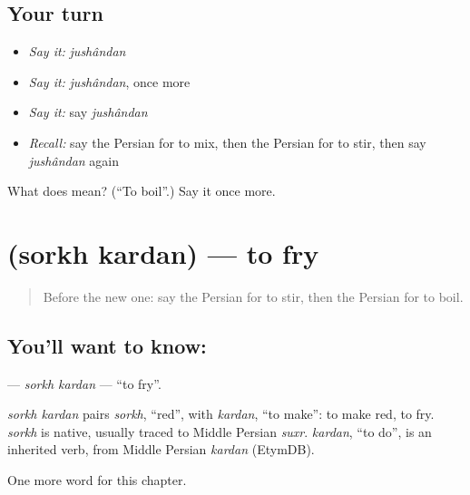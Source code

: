 \subsection*{Your turn}
\begin{itemize}
\raggedright
  \item \emph{Say it:} \emph{jushândan}
  \item \emph{Say it:} \emph{jushândan}, once more
  \item \emph{Say it:} say \emph{jushândan}
  \item \emph{Recall:} say the Persian for to mix, then the Persian for to stir, then say \emph{jushândan} again
\end{itemize}

\begin{tcolorbox}[breakable,colback=teal!4,colframe=teal!35!black,title={Before you move on}]
What does  mean? (\textquotedblleft{}To boil\textquotedblright{}.) Say it once more.
\end{tcolorbox}
\section[\texorpdfstring{\fa{سرخ} \fa{کردن} (sorkh kardan)}{سرخ کردن (sorkh kardan)}]{  (sorkh kardan) — to fry}

\label{lesson:FA-C180-sorkh-kardan}



\begin{quote}
Before the new one: say the Persian for to stir, then the Persian for to boil.
\end{quote}

\subsection*{You'll want to know:  }
\textbf{ } — \emph{sorkh kardan} — \textquotedblleft{}to fry\textquotedblright{}.

\begin{cousinweb}
\emph{sorkh kardan} pairs \emph{sorkh}, \textquotedblleft{}red\textquotedblright{}, with \emph{kardan}, \textquotedblleft{}to make\textquotedblright{}: to make red, to fry. \emph{sorkh} is native, usually traced to Middle Persian \emph{suxr}. \emph{kardan}, \textquotedblleft{}to do\textquotedblright{}, is an inherited verb, from Middle Persian \emph{kardan} (EtymDB).
\end{cousinweb}

\begin{grammarlens}[title={What you've built}]
One more word for this chapter.
\end{grammarlens}

